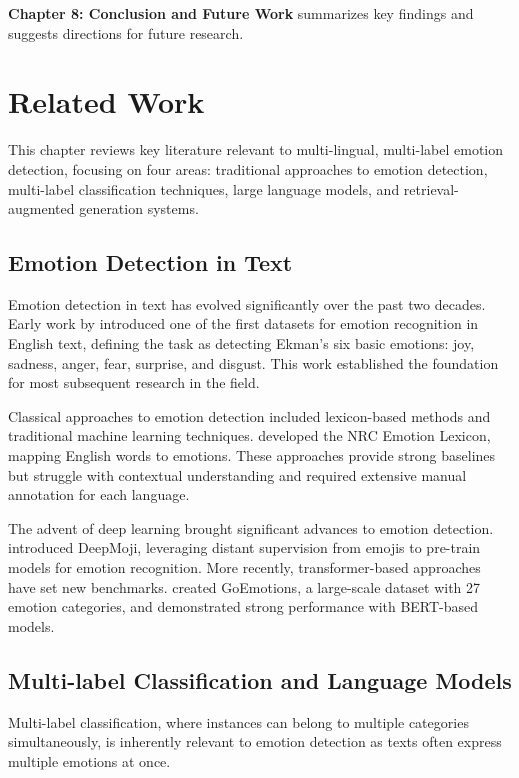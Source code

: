 \documentclass[a4paper,12pt]{extarticle}
\begin{document}
\textbf{Chapter 8: Conclusion and Future Work} summarizes key findings and suggests directions for future research.

\section{Related Work}

This chapter reviews key literature relevant to multi-lingual, multi-label emotion detection, focusing on four areas: traditional approaches to emotion detection, multi-label classification techniques, large language models, and retrieval-augmented generation systems.

\subsection{Emotion Detection in Text}

Emotion detection in text has evolved significantly over the past two decades. Early work by \cite{strapparava2007semeval} introduced one of the first datasets for emotion recognition in English text, defining the task as detecting Ekman's six basic emotions: joy, sadness, anger, fear, surprise, and disgust. This work established the foundation for most subsequent research in the field.

Classical approaches to emotion detection included lexicon-based methods and traditional machine learning techniques. \cite{mohammad2013crowdsourcing} developed the NRC Emotion Lexicon, mapping English words to emotions. These approaches provide strong baselines but struggle with contextual understanding and required extensive manual annotation for each language.

The advent of deep learning brought significant advances to emotion detection. \cite{felbo2017using} introduced DeepMoji, leveraging distant supervision from emojis to pre-train models for emotion recognition. More recently, transformer-based approaches have set new benchmarks. \cite{demszky2020goemotions} created GoEmotions, a large-scale dataset with 27 emotion categories, and demonstrated strong performance with BERT-based models.

\subsection{Multi-label Classification and Language Models}

Multi-label classification, where instances can belong to multiple categories simultaneously, is inherently relevant to emotion detection as texts often express multiple emotions at once. 
\end{document}
